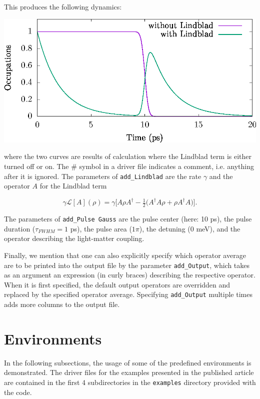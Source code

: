 \documentclass{scrartcl}
\begin{document}
This produces the following dynamics:

\includegraphics[width=20cm]{figs/example2.eps}

where the two curves are results of calculation where the Lindblad term is
either turned off or on. The \# symbol in a driver file indicates a comment, 
i.e. anything after it is ignored. The parameters of \texttt{add\_Lindblad}
are the rate $\gamma$ and the operator $A$ for the Lindblad term

\begin{equation}
\gamma \mathcal{L}[A](\rho)=\gamma\bigg[ A\rho A^\dagger 
-\tfrac 12\big(A^\dagger A\rho +\rho A^\dagger A \big)\bigg].
\end{equation}

The parameters of \verb+add_Pulse Gauss+ are the pulse center (here: 10 ps),
the pulse duration ($\tau_{FWHM}=1$ ps), the pulse area ($1 \pi$), the
detuning ($0$ meV), and the operator describing the light-matter coupling.

Finally, we mention that one can also explicitly specify which operator
average are to be printed into the output file by the parameter 
\verb+add_Output+, which takes as an argument an expression (in curly braces)
describing the respective operator. When it is first specified, the default
output operators are overridden and replaced by the specified operator average.
Specifying \verb+add_Output+ multiple times adds more columns to the output 
file.

\section{Environments}
In the following subsections, the usage of some of the predefined environments 
is demonstrated.
The driver files for the examples presented in the published article 
are contained in the first 4 subdirectories in the \texttt{examples} 
directory provided with the code.
\end{document}
